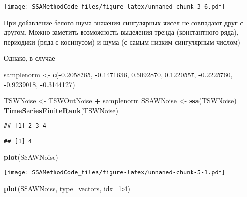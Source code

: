 \documentclass[
]{article}
\newenvironment{Shaded}{\begin{snugshade}}{\end{snugshade}}
\newcommand{\AttributeTok}[1]{\textcolor[rgb]{0.13,0.29,0.53}{#1}}
\newcommand{\DecValTok}[1]{\textcolor[rgb]{0.00,0.00,0.81}{#1}}
\newcommand{\FloatTok}[1]{\textcolor[rgb]{0.00,0.00,0.81}{#1}}
\newcommand{\FunctionTok}[1]{\textcolor[rgb]{0.13,0.29,0.53}{\textbf{#1}}}
\newcommand{\NormalTok}[1]{#1}
\newcommand{\OtherTok}[1]{\textcolor[rgb]{0.56,0.35,0.01}{#1}}
\newcommand{\SpecialCharTok}[1]{\textcolor[rgb]{0.81,0.36,0.00}{\textbf{#1}}}
\newcommand{\StringTok}[1]{\textcolor[rgb]{0.31,0.60,0.02}{#1}}
\begin{document}
\texttt{[image: SSAMethodCode\_files/figure-latex/unnamed-chunk-3-6.pdf]}

При добавление белого шума значения сингулярных чисел не совпадают друг
с другом. Можно заметить возможность выделения тренда (константного
ряда), периодики (ряда с косинусом) и шума (с самым низким сингулярным
числом)

Однако, в случае

\begin{Shaded}
\begin{Highlighting}[]
\NormalTok{samplenorm }\OtherTok{\textless{}{-}} \FunctionTok{c}\NormalTok{(}\SpecialCharTok{{-}}\FloatTok{0.2058265}\NormalTok{, }\SpecialCharTok{{-}}\FloatTok{0.1471636}\NormalTok{, }\FloatTok{0.6092870}\NormalTok{, }\FloatTok{0.1220557}\NormalTok{, }\SpecialCharTok{{-}}\FloatTok{0.2225760}\NormalTok{, }\SpecialCharTok{{-}}\FloatTok{0.9239018}\NormalTok{, }\SpecialCharTok{{-}}\FloatTok{0.3144127}\NormalTok{)}
\end{Highlighting}
\end{Shaded}

\begin{Shaded}
\begin{Highlighting}[]
\NormalTok{TSWNoise }\OtherTok{\textless{}{-}}\NormalTok{ TSWOutNoise }\SpecialCharTok{+}\NormalTok{ samplenorm}
\NormalTok{SSAWNoise }\OtherTok{\textless{}{-}} \FunctionTok{ssa}\NormalTok{(TSWNoise) }
\FunctionTok{TimeSeriesFiniteRank}\NormalTok{(TSWNoise)}
\end{Highlighting}
\end{Shaded}

\begin{verbatim}
## [1] 2 3 4
\end{verbatim}

\begin{verbatim}
## [1] 4
\end{verbatim}

\begin{Shaded}
\begin{Highlighting}[]
\FunctionTok{plot}\NormalTok{(SSAWNoise)}
\end{Highlighting}
\end{Shaded}

\texttt{[image: SSAMethodCode\_files/figure-latex/unnamed-chunk-5-1.pdf]}

\begin{Shaded}
\begin{Highlighting}[]
\FunctionTok{plot}\NormalTok{(SSAWNoise, }\AttributeTok{type=}\StringTok{\textquotesingle{}vectors\textquotesingle{}}\NormalTok{, }\AttributeTok{idx=}\DecValTok{1}\SpecialCharTok{:}\DecValTok{4}\NormalTok{)}
\end{Highlighting}
\end{Shaded}
\end{document}
